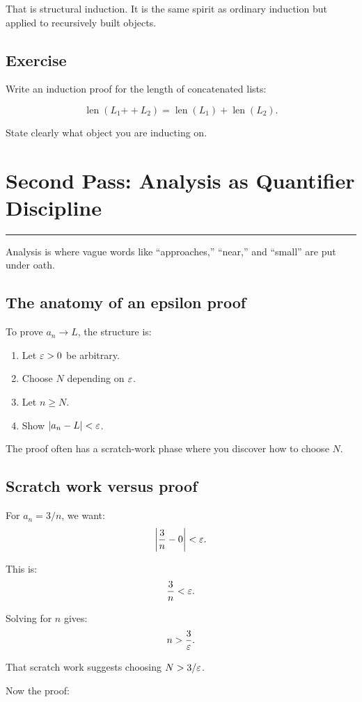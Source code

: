 \documentclass[12pt]{article}
\newcommand{\chapterline}{\vspace{0.4em}\hrule\vspace{0.8em}}
\begin{document}
That is structural induction. It is the same spirit as ordinary induction but applied to recursively built objects.

\subsection{Exercise}

Write an induction proof for the length of concatenated lists:

\[
\operatorname{len}(L_1\mathbin{++}L_2)=\operatorname{len}(L_1)+\operatorname{len}(L_2).
\]

State clearly what object you are inducting on.

\newpage
\section{Second Pass: Analysis as Quantifier Discipline}
\chapterline

Analysis is where vague words like ``approaches,'' ``near,'' and ``small'' are put under oath.

\subsection{The anatomy of an epsilon proof}

To prove $a_n\to L$, the structure is:

\begin{enumerate}
\item Let $\varepsilon>0$ be arbitrary.
\item Choose $N$ depending on $\varepsilon$.
\item Let $n\geq N$.
\item Show $|a_n-L|<\varepsilon$.
\end{enumerate}

The proof often has a scratch-work phase where you discover how to choose $N$.

\subsection{Scratch work versus proof}

For $a_n=3/n$, we want:
\[
\left|\frac3n-0\right|<\varepsilon.
\]

This is:
\[
\frac3n<\varepsilon.
\]

Solving for $n$ gives:
\[
n>\frac3{\varepsilon}.
\]

That scratch work suggests choosing $N>3/\varepsilon$.

Now the proof:
\end{document}
